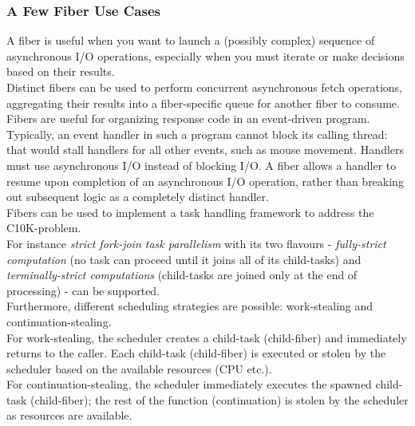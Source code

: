 \subsubsection*{A Few Fiber Use Cases}
A fiber is useful when you want to launch a (possibly complex) sequence of
asynchronous I/O operations, especially when you must iterate or make
decisions based on their results.\\
\newline
Distinct fibers can be used to perform concurrent asynchronous fetch
operations, aggregating their results into a fiber-specific queue for another
fiber to consume.\\
\newline
Fibers are useful for organizing response code in an event-driven program.
Typically, an event handler in such a program cannot block its calling thread:
that would stall handlers for all other events, such as mouse movement.
Handlers must use asynchronous I/O instead of blocking I/O. A fiber allows a
handler to resume upon completion of an asynchronous I/O operation, rather
than breaking out subsequent logic as a completely distinct handler.\\
\newline
Fibers can be used to implement a task handling framework to address the
C10K-problem\cite{c10k}.\\
For instance \textit{strict fork-join task parallelism}\cite{n3832} with its two
flavours - \textit{fully-strict computation}\cite{n3832} (no task
can proceed until it joins all of its child-tasks) and
\textit{terminally-strict computations}\cite{n3832} (child-tasks are joined
only at the end of processing) - can be supported.\\
Furthermore, different scheduling strategies are possible: work-stealing and
continuation-stealing.\\
For work-stealing, the scheduler creates a child-task (child-fiber)
and immediately returns to the caller. Each child-task (child-fiber) is executed or
stolen by the scheduler based on the available resources (CPU etc.).\\
For continuation-stealing, the scheduler immediately executes the
spawned child-task (child-fiber); the rest of the function
(continuation) is stolen by the scheduler as resources are available.\\
